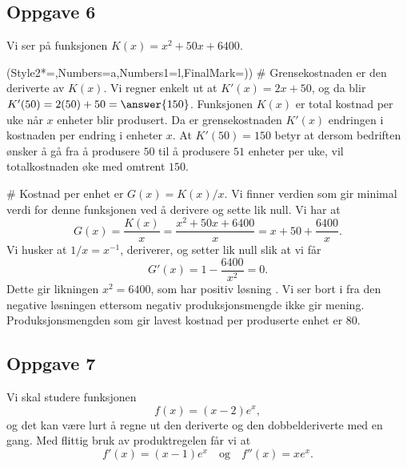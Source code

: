 \subsection*{Oppgave 6}
Vi ser på funksjonen $K(x) = x^2 + 50x + 6400$.
\begin{easylist}[enumerate]
\ListProperties(Style2*=,Numbers=a,Numbers1=l,FinalMark={)})
# Grensekostnaden er den deriverte av $K(x)$. 
Vi regner enkelt ut at $K'(x) = 2x + 50$, og da blir $K'(50) = 2 (50) + 50 = \answer{150}$.
Funksjonen $K(x)$ er total kostnad per uke når $x$ enheter blir produsert.
Da er grensekostnaden $K'(x)$ endringen i kostnaden per endring i enheter $x$.
At $K'(50) = 150$ betyr at dersom bedriften ønsker å gå fra å produsere $50$ til å produsere $51$ enheter per uke, vil totalkostnaden øke med omtrent $150$.

# Kostnad per enhet er $G(x) = K(x)  / x$.
Vi finner verdien som gir minimal verdi for denne funksjonen
ved å derivere og sette lik null. Vi har at 
\begin{equation*}
	G(x) = \frac{K(x)}{x} = \frac{x^2 + 50x + 6400}{x} = x + 50 + \frac{6400}{x}.
\end{equation*}
Vi husker at $1 / x = x^{-1}$, deriverer, og setter lik null slik at vi får
\begin{equation*}
G'(x) = 1 - \frac{6400}{x^2} = 0.
\end{equation*}
Dette gir likningen $x^2 = 6400$, som har positiv løsning .
Vi ser bort i fra den negative løsningen ettersom negativ produksjonsmengde ikke gir mening.
Produksjonsmengden som gir lavest kostnad per produserte enhet er $80$.
\end{easylist}

\subsection*{Oppgave 7}
Vi skal studere funksjonen
\begin{equation*}
	f(x) = (x - 2) e^x,
\end{equation*}
og det kan være lurt å regne ut den deriverte og den dobbelderiverte med en gang.
Med flittig bruk av produktregelen får vi at
\begin{equation*}
	f'(x) = (x - 1) e^x \quad \text{og} \quad f''(x) = x e^x.
\end{equation*}


